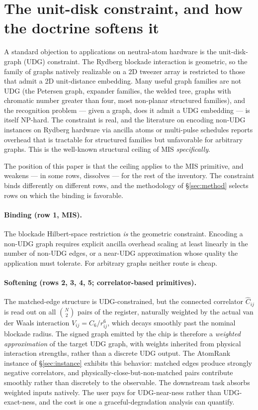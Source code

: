 \documentclass[10pt]{article}
\begin{document}
\section{The unit-disk constraint, and how the doctrine softens it}\label{sec:udg}

A standard objection to applications on neutral-atom hardware is the unit-disk-graph (UDG) constraint. The Rydberg blockade interaction is geometric, so the family of graphs natively realizable on a 2D tweezer array is restricted to those that admit a 2D unit-distance embedding. Many useful graph families are not UDG (the Petersen graph, expander families, the welded tree, graphs with chromatic number greater than four, most non-planar structured families), and the recognition problem --- given a graph, does it admit a UDG embedding --- is itself NP-hard. The constraint is real, and the literature on encoding non-UDG instances on Rydberg hardware via ancilla atoms or multi-pulse schedules \cite{pichler2018quantum,nguyen2023quantum} reports overhead that is tractable for structured families but unfavorable for arbitrary graphs. This is the well-known structural ceiling of MIS \emph{specifically}.

The position of this paper is that the ceiling applies to the MIS primitive, and weakens --- in some rows, dissolves --- for the rest of the inventory. The constraint binds differently on different rows, and the methodology of \S\ref{sec:method} selects rows on which the binding is favorable.

\paragraph{Binding (row 1, MIS).}
The blockade Hilbert-space restriction \emph{is} the geometric constraint. Encoding a non-UDG graph requires explicit ancilla overhead scaling at least linearly in the number of non-UDG edges, or a near-UDG approximation whose quality the application must tolerate. For arbitrary graphs neither route is cheap.

\paragraph{Softening (rows 2, 3, 4, 5; correlator-based primitives).}
The matched-edge structure is UDG-constrained, but the connected correlator $\hat C_{ij}$ is read out on all $\binom{N}{2}$ pairs of the register, naturally weighted by the actual van der Waals interaction $V_{ij} = C_6/r_{ij}^6$, which decays smoothly past the nominal blockade radius. The signed graph emitted by the chip is therefore a \emph{weighted approximation} of the target UDG graph, with weights inherited from physical interaction strengths, rather than a discrete UDG output. The AtomRank instance of \S\ref{sec:instance} exhibits this behavior: matched edges produce strongly negative correlators, and physically-close-but-non-matched pairs contribute smoothly rather than discretely to the observable. The downstream task absorbs weighted inputs natively. The user pays for UDG-near-ness rather than UDG-exact-ness, and the cost is one a graceful-degradation analysis can quantify.
\end{document}
